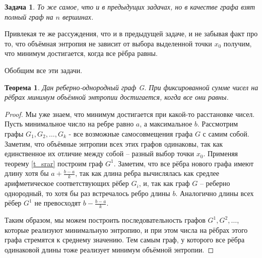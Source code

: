 \documentclass[11pt]{article}
\theoremstyle{definition}
\theoremstyle{plain}
\theoremstyle{plain}
\newtheorem{problem}{Задача}
\newtheorem{theorem}{Теорема}
\begin{document}
\begin{problem}
То же самое, что и в предыдущих задачах, но в качестве графа взят полный граф на $n$ вершинах.
\end{problem}
Привлекая те же рассуждения, что и в предыдущей задаче, и не забывая факт про то, 
что объёмная энтропия не зависит от выбора выделенной точки $x_0$ получим, что минимум достигается, когда все рёбра равны.

\medskip
Обобщим все эти задачи.

\begin{theorem}
Дан реберно-однородный граф G. При фиксированной сумме чисел на рёбрах минимум объёмной энтропии достигается, когда все они равны.
\end{theorem}

\begin{proof}
Мы уже знаем, что минимум достигается при какой-то расстановке чисел. 
Пусть минимальное число на ребре равно $a$, а максимальное $b$. 
Рассмотрим графы $G_1, G_2, \dots, G_k$ - все возможные самосовмещения графа $G$ с самим собой.
Заметим, что объёмные энтропии всех этих графов одинаковы, так как единственное их отличие между собой -- 
разный выбор точки $x_0$. Применяя теорему \ref{t_srar} построим граф $G^1$. 
Заметим, что все рёбра нового графа имеют длину хотя бы $a + \frac{b-a}{k}$, 
так как длина ребра вычислялась как средлее арифметическое соответствующих рёбер $G_i$, и, 
так как граф $G$ -- реберно однородный, то хотя бы раз встречалось ребро длины $b$.
Аналогично длины всех рёбер $G^1$ не превосходят $b-\frac{b-a}{k}$.

Таким образом, мы можем построить последовательность графов $G^1,G^2,\dots$, которые реализуют минимальную энтропию, 
и при этом числа на рёбрах этого графа стремятся к среднему значению. 
Тем самым граф, у которого все рёбра одинаковой длины тоже реализует минимум объёмной энтропии.

\end{proof}
\end{document}
